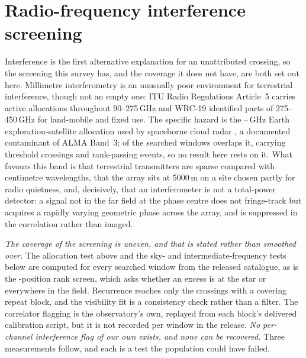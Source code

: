 \section{Radio-frequency interference screening}
\label{app:rfi}

Interference is the first alternative explanation for an unattributed
crossing, so the screening this survey has, and the coverage it does not
have, are both set out here. Millimetre interferometry is an unusually poor
environment for terrestrial interference, though not an empty one: ITU Radio
Regulations Article~5 \citep{ITU2024} carries active allocations throughout
90--275\,GHz and WRC-19 identified parts of 275--450\,GHz for land-mobile and
fixed use. The specific hazard is the \RadarLo--\RadarHi\,GHz Earth
exploration-satellite allocation used by spaceborne cloud radar
\citep{CloudSat2002,EarthCARE2023}, a documented contaminant of ALMA Band~3;
\RadarNWin{} of the \RadarNTot{} searched windows overlaps it, carrying
\RadarNCross{} threshold crossings and \RadarNStage{} rank-passing events, so
no result here rests on it. What favours this band is that terrestrial
transmitters are sparse compared with centimetre wavelengths, that the array
sits at 5000\,m on a site chosen partly for radio quietness, and, decisively,
that an interferometer is not a total-power detector: a signal not in the far
field at the phase centre does not fringe-track but acquires a rapidly
varying geometric phase across the array, and is suppressed in the
correlation rather than imaged.

\emph{The coverage of the screening is uneven, and that is stated rather than
smoothed over.} The allocation test above and the sky- and
intermediate-frequency tests below are computed for every searched window
from the released catalogue, as is the \NCtrl-position rank screen, which
asks whether an excess is at the star or everywhere in the field. Recurrence
reaches only the crossings with a covering repeat block, and the visibility
fit is a consistency check rather than a filter. The correlator flagging is
the observatory's own, replayed from each block's delivered calibration
script, but it is not recorded per window in the release. \emph{No
per-channel interference flag of our own exists, and none can be recovered.}
Three measurements follow, and each is a test the population could have
failed.

